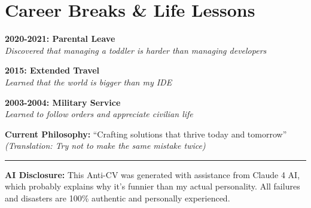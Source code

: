 \documentclass[11pt,a4paper]{article}
\begin{document}
\section{Career Breaks \& Life Lessons}

\textbf{2020-2021: Parental Leave}\\
\textit{Discovered that managing a toddler is harder than managing developers}

\textbf{2015: Extended Travel}\\
\textit{Learned that the world is bigger than my IDE}

\textbf{2003-2004: Military Service}\\
\textit{Learned to follow orders and appreciate civilian life}

\vspace{1em}

\begin{center}
\textbf{Current Philosophy:} ``Crafting solutions that thrive today and tomorrow''\\
\textit{(Translation: Try not to make the same mistake twice)}
\end{center}

\vspace{0.5em}

\hrule

\vspace{0.3em}

{\footnotesize \textbf{AI Disclosure:} This Anti-CV was generated with assistance from Claude 4 AI, which probably explains why it's funnier than my actual personality. All failures and disasters are 100\% authentic and personally experienced.}
\end{document}
